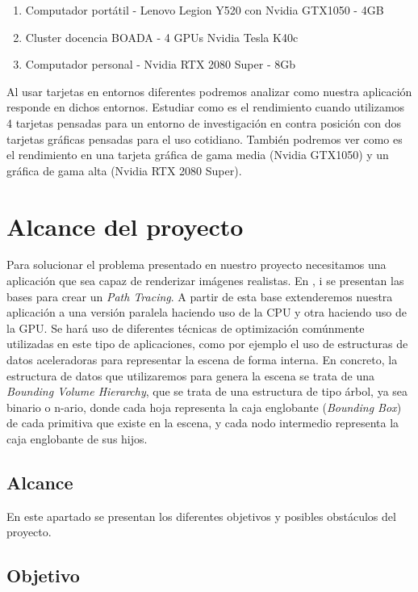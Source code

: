 \documentclass[twoside,a4paper,titlepage,11pt]{report}
\begin{document}
\begin{enumerate}
	\item Computador portátil - Lenovo Legion Y520 con Nvidia GTX1050 - 4GB 
	\item Cluster docencia BOADA - 4 GPUs Nvidia Tesla K40c
	\item Computador personal - Nvidia RTX 2080 Super - 8Gb 
\end{enumerate}

Al usar tarjetas en entornos diferentes podremos analizar como nuestra aplicación responde en dichos entornos. Estudiar como es el rendimiento cuando utilizamos 4 tarjetas pensadas para un entorno de investigación en contra posición con dos tarjetas gráficas pensadas para el uso cotidiano. También podremos ver como es el rendimiento en una tarjeta gráfica de gama media (Nvidia GTX1050) y un gráfica de gama alta (Nvidia RTX 2080 Super).

\section{Alcance del proyecto}

Para solucionar el problema presentado en nuestro proyecto necesitamos una aplicación que sea capaz de renderizar imágenes realistas. En \cite{Shirley2018a}, \cite{Shirley2018b} i \cite{Shirley2018c} se presentan las bases para crear un \textit{Path Tracing}. A partir de esta base extenderemos nuestra aplicación a una versión paralela haciendo uso de la CPU y otra haciendo uso de la GPU. Se hará uso de diferentes técnicas de optimización comúnmente utilizadas en este tipo de aplicaciones, como por ejemplo el uso de estructuras de datos aceleradoras \cite{Hunt2008} para representar la escena de forma interna. En concreto, la estructura de datos que utilizaremos para genera la escena se trata de una \textit{Bounding Volume Hierarchy}, que se trata de una estructura de tipo árbol, ya sea binario o n-ario, donde cada hoja representa la caja englobante (\textit{Bounding Box}) de cada primitiva que existe en la escena, y cada nodo intermedio representa la caja englobante de sus hijos.

\subsection{Alcance}

En este apartado se presentan los diferentes objetivos y posibles obstáculos del proyecto.

\subsection{Objetivo}
\end{document}
